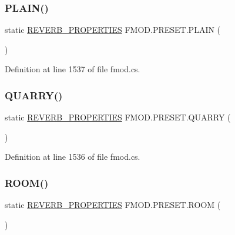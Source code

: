 \subsubsection{\texorpdfstring{P\+L\+A\+I\+N()}{PLAIN()}}
{\footnotesize\ttfamily static \hyperlink{struct_f_m_o_d_1_1_r_e_v_e_r_b___p_r_o_p_e_r_t_i_e_s}{R\+E\+V\+E\+R\+B\+\_\+\+P\+R\+O\+P\+E\+R\+T\+I\+ES} F\+M\+O\+D.\+P\+R\+E\+S\+E\+T.\+P\+L\+A\+IN (\begin{DoxyParamCaption}{ }\end{DoxyParamCaption})\hspace{0.3cm}{\ttfamily [static]}}



Definition at line 1537 of file fmod.\+cs.

\mbox{\label{class_f_m_o_d_1_1_p_r_e_s_e_t_a47482de1ffe1d96cf26443d831d42008}} 
\subsubsection{\texorpdfstring{Q\+U\+A\+R\+R\+Y()}{QUARRY()}}
{\footnotesize\ttfamily static \hyperlink{struct_f_m_o_d_1_1_r_e_v_e_r_b___p_r_o_p_e_r_t_i_e_s}{R\+E\+V\+E\+R\+B\+\_\+\+P\+R\+O\+P\+E\+R\+T\+I\+ES} F\+M\+O\+D.\+P\+R\+E\+S\+E\+T.\+Q\+U\+A\+R\+RY (\begin{DoxyParamCaption}{ }\end{DoxyParamCaption})\hspace{0.3cm}{\ttfamily [static]}}



Definition at line 1536 of file fmod.\+cs.

\mbox{\label{class_f_m_o_d_1_1_p_r_e_s_e_t_a8381d1df80b9f43f77a54a100ffc116d}} 
\subsubsection{\texorpdfstring{R\+O\+O\+M()}{ROOM()}}
{\footnotesize\ttfamily static \hyperlink{struct_f_m_o_d_1_1_r_e_v_e_r_b___p_r_o_p_e_r_t_i_e_s}{R\+E\+V\+E\+R\+B\+\_\+\+P\+R\+O\+P\+E\+R\+T\+I\+ES} F\+M\+O\+D.\+P\+R\+E\+S\+E\+T.\+R\+O\+OM (\begin{DoxyParamCaption}{ }\end{DoxyParamCaption})\hspace{0.3cm}{\ttfamily [static]}}



